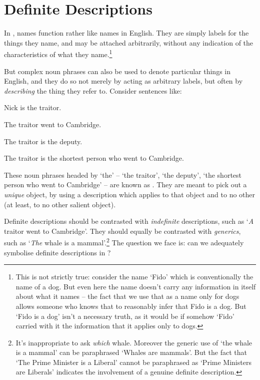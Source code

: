 \chapter{Definite Descriptions}\label{subsec.defdesc}
In \FOL, names function rather like names in English. They are simply labels for the things they name, and may be attached arbitrarily, without any indication of the characteristics of what they name.\footnote{This is not strictly true: consider the name `Fido' which is conventionally the name of a dog. But even here the name doesn't carry any information in itself about what it names – the fact that we use that as a name only for dogs allows someone who knows that to reasonably infer that Fido is a dog. But `Fido is a dog' isn't a necessary truth, as it would be if somehow `Fido' carried with it the information that it applies only to dogs.} 

But complex noun phrases can also be used to denote particular things in English, and they do so not merely by acting as arbitrary labels, but often by \emph{describing} the thing they refer to. Consider sentences like:
	\begin{earg}
		\item[\ex{traitor1}] Nick is the traitor.
		\item[\ex{traitor2}] The traitor went to Cambridge.
		\item[\ex{traitor3}] The traitor is the deputy.
		\item[\ex{traitor4}] The traitor is the shortest person who went to Cambridge.
	\end{earg}
These noun phrases headed by `the' – `the traitor', `the deputy', `the shortest person who went to Cambridge' – are known as . They are meant to pick out a \emph{unique} object, by using a description which applies to that object and to no other (at least, to no other salient object).  

Definite descriptions should be contrasted with \emph{indefinite} descriptions, such as `\emph{A} traitor went to Cambridge'. They should equally be contrasted with \emph{generics}, such as `\emph{The} whale is a mammal'.\footnote{It's inappropriate to ask \emph{which} whale. Moreover the generic use of `the whale is a mammal' can be paraphrased `Whales are mammals'. But the fact that `The Prime Minister is a Liberal' cannot be paraphrased as `Prime Ministers are Liberals' indicates the involvement of a genuine definite description.} The question we face is: can we adequately symbolise definite descriptions in \FOL?


